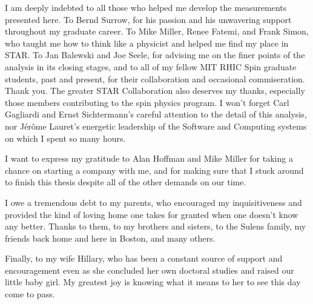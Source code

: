 I am deeply indebted to all those who helped me develop the measurements
presented here. To Bernd Surrow, for his passion and his unwavering support
throughout my graduate career. To Mike Miller, Renee Fatemi, and Frank Simon,
who taught me how to think like a physicist and helped me find my place in STAR.
To Jan Balewski and Joe Seele, for advising me on the finer points of the
analysis in its closing stages, and to all of my fellow MIT RHIC Spin graduate
students, past and present, for their collaboration and occasional
commiseration. Thank you. The greater STAR Collaboration also deserves my
thanks, especially those members contributing to the spin physics program. I
won't forget Carl Gagliardi and Ernst Sichtermann's careful attention to the
detail of this analysis, nor J\'er\^ome Lauret's energetic leadership of the
Software and Computing systems on which I spent so many hours.

I want to express my gratitude to Alan Hoffman and Mike Miller for taking a
chance on starting a company with me, and for making sure that I stuck around to
finish this thesis despite all of the other demands on our time.

I owe a tremendous debt to my parents, who encouraged my inquisitiveness and
provided the kind of loving home one takes for granted when one doesn't know any
better. Thanks to them, to my brothers and sisters, to the Sulens family, my
friends back home and here in Boston, and many others.

Finally, to my wife Hillary, who has been a constant source of support and
encouragement even as she concluded her own doctoral studies and raised our
little baby girl. My greatest joy is knowing what it means to her to see this
day come to pass.
